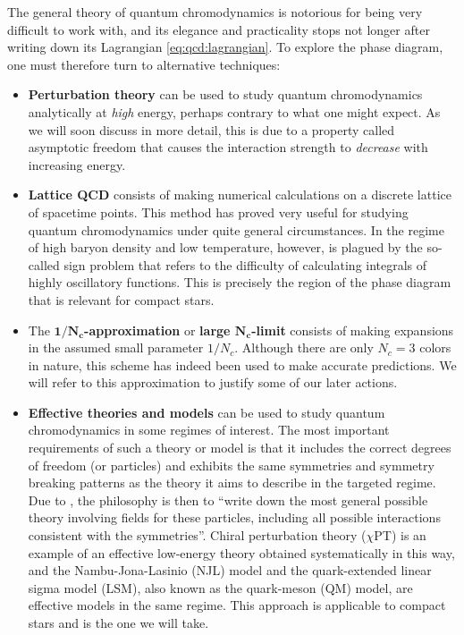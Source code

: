 The general theory of quantum chromodynamics is notorious for being very difficult to work with,
and its elegance and practicality stops not longer after writing down its Lagrangian \eqref{eq:qcd:lagrangian}.
To explore the phase diagram, one must therefore turn to alternative techniques:
\begin{itemize}
\item \textbf{Perturbation theory} can be used to study quantum chromodynamics analytically at \emph{high} energy, perhaps contrary to what one might expect.
      As we will soon discuss in more detail, this is due to a property called asymptotic freedom that causes the interaction strength to \emph{decrease} with increasing energy.
\item \textbf{Lattice QCD} consists of making numerical calculations on a discrete lattice of spacetime points.
      This method has proved very useful for studying quantum chromodynamics under quite general circumstances.
      In the regime of high baryon density and low temperature, however, is plagued by the so-called sign problem that refers to the difficulty of calculating integrals of highly oscillatory functions.
      This is precisely the region of the phase diagram that is relevant for compact stars.
\item The \textbf{$\bm{1/N_c}$-approximation} or \textbf{large $\bm{N_c}$-limit} consists of making expansions in the assumed small parameter $1/N_c$.
      Although there are only $N_c = 3$ colors in nature, this scheme has indeed been used to make accurate predictions.
      We will refer to this approximation to justify some of our later actions.
\item \textbf{Effective theories and models} can be used to study quantum chromodynamics in some regimes of interest.
      The most important requirements of such a theory or model is that it includes the correct degrees of freedom (or particles) and exhibits the same symmetries and symmetry breaking patterns as the theory it aims to describe in the targeted regime.
      Due to \cite{ref:weinberg_eft}, the philosophy is then to ``write down the most general possible theory involving fields for these particles, including all possible interactions consistent with the symmetries''.
      Chiral perturbation theory ($\chi$PT) is an example of an effective low-energy theory obtained systematically in this way,
      and the Nambu-Jona-Lasinio (NJL) model and the quark-extended linear sigma model (LSM), also known as the quark-meson (QM) model, are effective models in the same regime.
      This approach is applicable to compact stars and is the one we will take.
\end{itemize}

